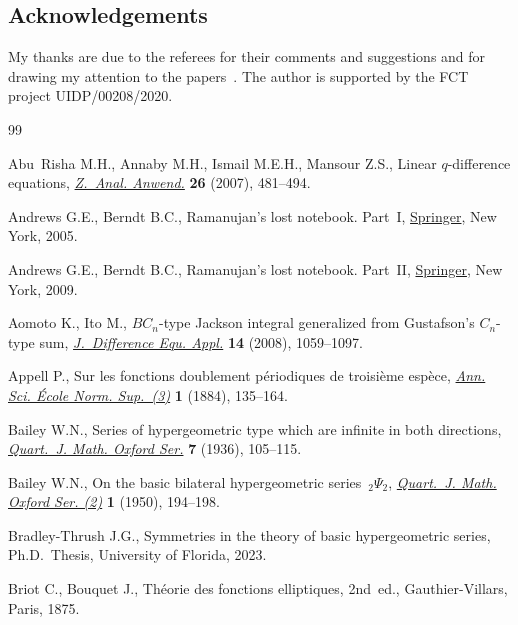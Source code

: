 \documentclass[10pt,a4paper]{amsart}
\numberwithin{equation}{section}
\begin{document}
\subsection*{Acknowledgements}
My thanks are due to the referees for their comments and suggestions and for drawing my attention to the papers~\cite{Ito2014,Ito2008, Rosengren2006}. The author is supported by the FCT project UIDP/00208/2020.


\begin{thebibliography}{99}
\footnotesize\itemsep=0pt

Abu~Risha M.H., Annaby M.H., Ismail M.E.H., Mansour Z.S., Linear
 {$q$}-difference equations,
 \href{https://doi.org/10.4171/ZAA/1338}{\textit{Z.~Anal. Anwend.}}
 \textbf{26} (2007), 481--494.

Andrews G.E., Berndt B.C., Ramanujan's lost notebook. {P}art~{I},
 \href{https://doi.org/10.1007/0-387-28124-X}{Springer}, New York, 2005.

Andrews G.E., Berndt B.C., Ramanujan's lost notebook. {P}art~{II},
 \href{https://doi.org/10.1007/b13290}{Springer}, New York, 2009.

Aomoto K., Ito M., {$BC_n$}-type {J}ackson integral generalized from
 {G}ustafson's {$C_n$}-type sum,
 \href{https://doi.org/10.1080/10236190701776043}{\textit{J.~Difference Equ.
 Appl.}} \textbf{14} (2008), 1059--1097.

Appell P., Sur les fonctions doublement p\'eriodiques de troisi\`eme esp\`ece,
 \href{https://doi.org/10.24033/asens.236}{\textit{Ann. Sci. \'Ecole Norm.
 Sup.~(3)}} \textbf{1} (1884), 135--164.

Bailey W.N., Series of hypergeometric type which are infinite in both
 directions, \href{https://doi.org/10.1093/qmath/os-7.1.105}{\textit{Quart.~J.
 Math. Oxford Ser.}} \textbf{7} (1936), 105--115.

Bailey W.N., On the basic bilateral hypergeometric series~{${}_2\Psi_2$},
 \href{https://doi.org/10.1093/qmath/1.1.194}{\textit{Quart.~J. Math. Oxford
 Ser. (2)}} \textbf{1} (1950), 194--198.

Bradley-Thrush J.G., Symmetries in the theory of basic hypergeometric series,
 Ph.D.~Thesis, {U}niversity of Florida, 2023.

Briot C., Bouquet J., Th\'eorie des fonctions elliptiques, 2nd~ed.,
 Gauthier-Villars, Paris, 1875.


\end{thebibliography}
\end{document}
